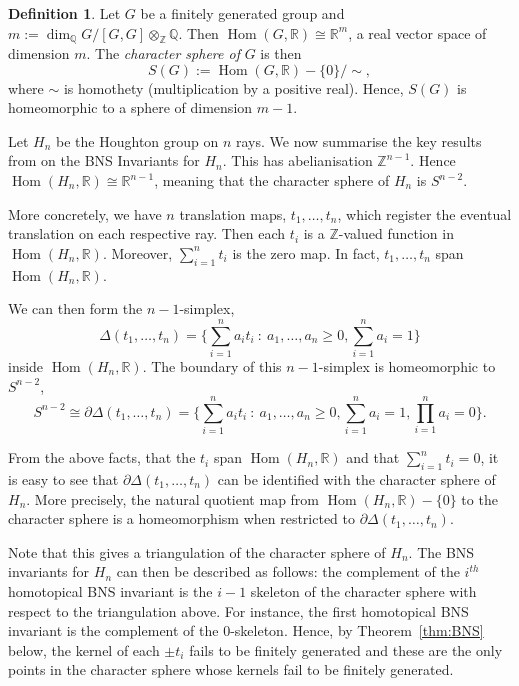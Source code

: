 \documentclass[11pt,a4paper]{amsart}
\theoremstyle{definition}
\newtheorem{definition}[theorem]{Definition}
\theoremstyle{remark}
\newcommand{\Q}{\mathbb Q}
\newcommand{\Z}{\mathbb Z}
\newcommand{\R}{\mathbb R}
\newcommand{\Hom}{\operatorname{Hom}}
\begin{document}
\begin{definition}
	Let $G$ be a finitely generated group and $m:=\dim_{\Q} G/[G,G] \otimes_{\Z} \Q$. Then $\Hom(G, \R) \cong \R^{m}$, a real vector space of dimension $m$. The \emph{character sphere of} $G$ is then
	$$S(G):=\Hom(G, \R) - \{ 0 \}/\sim,$$
	where $\sim$ is homothety (multiplication by a positive real). Hence, $S(G)$ is homeomorphic to a sphere of dimension $m-1$.  
\end{definition}


Let $H_n$ be the Houghton group on $n$ rays. We now summarise the key results from \cite{BNSRHoughton} on the BNS Invariants for $H_n$. This has abelianisation $\Z^{n-1}$. Hence $\Hom(H_n, \R) \cong \R^{n-1}$, meaning that the character sphere of $H_n$ is $S^{n-2}$. 

More concretely, we have $n$ translation maps, $t_1, \ldots, t_n$, which register the eventual translation on each respective ray. Then each $t_i$ is a $\Z$-valued function in $\Hom(H_n, \R)$. Moreover, $\sum_{i=1}^n t_i$ is the zero map. In fact, $t_1, \ldots, t_n$ span $\Hom(H_n, \R)$.

We can then form the $n-1$-simplex,
$$\Delta(t_1, \ldots, t_n) = \{ \sum_{i=1}^n a_i t_i \ : \ a_1,\ldots, a_n\ge 0, \sum_{i=1}^n a_i = 1\}$$
inside $\Hom(H_n, \R)$. The boundary of this $n-1$-simplex is homeomorphic to $S^{n-2}$, 
$$
S^{n-2} \cong \partial  \Delta(t_1, \ldots, t_n) = \{ \sum_{i=1}^n a_i t_i \ : \  a_1,\ldots, a_n\ge 0, \sum_{i=1}^n a_i = 1, \prod_{i=1}^n a_i = 0\}.
$$ 

From the above facts, that the $t_i$ span $\Hom(H_n, \R)$ and that $\sum_{i=1}^n t_i =0$, it is easy to see that $\partial  \Delta(t_1, \ldots, t_n)$ can be identified with the character sphere of $H_n$. More precisely, the natural quotient map from $\Hom(H_n, \R) - \{0 \}$ to the character sphere is a homeomorphism when restricted to $\partial  \Delta(t_1, \ldots, t_n)$. 

Note that this gives a triangulation of the character sphere of $H_n$. The BNS invariants for $H_n$ can then be described as follows: the complement of the $i^{th}$ homotopical BNS invariant is the $i-1$ skeleton of the character sphere with respect to the triangulation above. For instance, the first homotopical BNS invariant is the complement of the $0$-skeleton. Hence, by Theorem~\ref{thm:BNS} below, the kernel of each $\pm t_i$ fails to be finitely generated and these are the only points in the character sphere whose kernels fail to be finitely generated.
\end{document}
